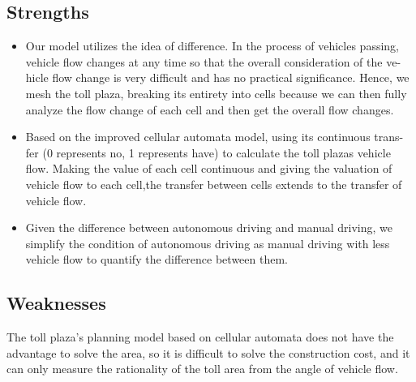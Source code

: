 \documentclass{mcmthesis}
\begin{document}
\subsection{Strengths}
\begin{itemize}
\item %
Our model utilizes the idea of difference. In the process of vehicles passing, vehicle flow changes at any time so that the overall consideration of the ve- hicle flow change is very difficult and has no practical significance. Hence, we mesh the toll plaza, breaking its entirety into cells because we can then fully analyze the flow change of each cell and then get the overall flow changes.
\item %
Based on the improved cellular automata model, using its continuous trans- fer (0 represents no, 1 represents have) to calculate the toll plazas vehicle flow. Making the value of each cell continuous and giving the valuation of vehicle flow to each cell,the transfer between cells extends to the transfer of vehicle flow.
\item %
Given the difference between autonomous driving and manual driving, we simplify the condition of autonomous driving as manual driving with less vehicle flow to quantify the difference between them.
\end{itemize}
\subsection{Weaknesses}
The toll plaza’s planning model based on cellular automata does not have the advantage to solve the area, so it is difficult to solve the construction cost, and it can only measure the rationality of the toll area from the angle of vehicle flow.
\newpage
\end{document}
